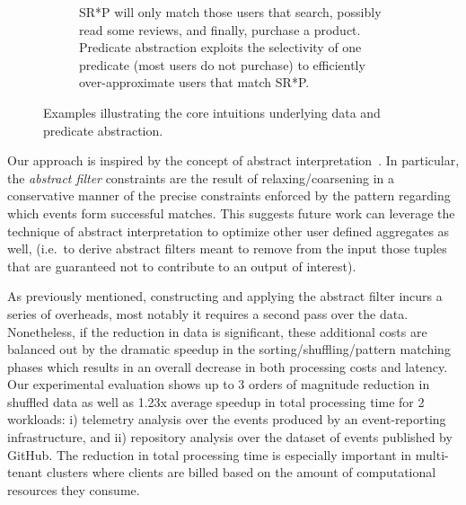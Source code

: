 \begin{figure}[t]
\begin{subfigure}{\columnwidth}
    \vspace{-2.5cm}
    \caption{SR*P will only match those users that search, possibly read
      some reviews, and finally, purchase a product.  Predicate abstraction
      exploits the selectivity of one predicate (most users do not purchase) to
      efficiently over-approximate users that match SR*P.}
    \label{fig:pabstraction}
  \end{subfigure}
  \caption{Examples illustrating the core intuitions underlying data and 
  predicate abstraction.}
\end{figure}
      
 
Our approach is inspired by the concept of abstract 
interpretation~\cite{Cousot:1977,Graf:1997}.  
In particular, the {\em abstract filter} constraints are the result of
relaxing/coarsening in a conservative manner of the precise constraints enforced
by the pattern regarding which events form successful matches.  This suggests
future work can leverage the technique of abstract interpretation to optimize
other user defined aggregates as well, (i.e.\ to derive abstract filters meant 
to remove from the input those tuples that are guaranteed not to contribute to 
an output of interest).


As previously mentioned, constructing and applying the abstract filter incurs a
series of overheads, most notably it requires a second pass over the data.
Nonetheless, if the reduction in data is significant, these additional costs are
balanced out by the dramatic speedup in the sorting/shuffling/pattern matching
phases which results in an overall decrease in both processing costs and
latency.  Our experimental evaluation shows up to 3 orders of magnitude
reduction in shuffled data as well as 1.23x average speedup in total processing
time for 2 workloads: i) telemetry analysis over the events produced by an
event-reporting infrastructure, and ii) repository analysis over the dataset of
events published by GitHub.  The reduction in total processing time is
especially important in multi-tenant clusters where clients are billed based on
the amount of computational resources they consume.

